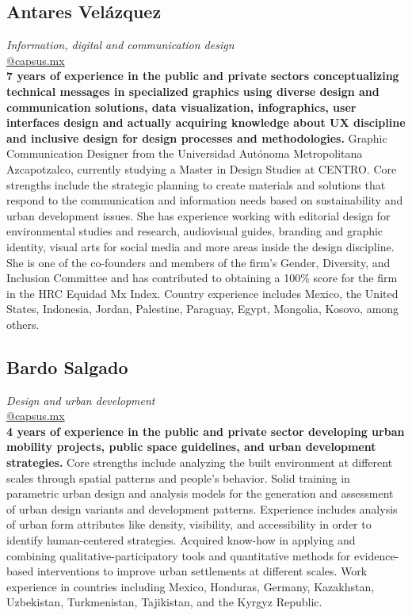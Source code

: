 \documentclass[
	a4paper,
	12pt,
	unnumberedsections,
]{CSSullivanBusinessReport}
\begin{document}
\subsection*{Antares Velázquez}
\textit{Information, digital and communication design} \\
\href{mailto:@capsus.mx}{@capsus.mx} \\[0.5em]
\textbf{7 years of experience in the public and private sectors conceptualizing technical messages in specialized graphics using diverse design and communication solutions, data visualization, infographics, user interfaces design and actually acquiring knowledge about UX discipline and inclusive design for design processes and methodologies.} Graphic Communication Designer from the Universidad Autónoma Metropolitana Azcapotzalco, currently studying a Master in Design Studies at CENTRO. Core strengths include the strategic planning to create materials and solutions that respond to the communication and information needs based on sustainability and urban development issues. She has experience working with editorial design for environmental studies and research, audiovisual guides, branding and graphic identity, visual arts for social media and more areas inside the design discipline. She is one of the co-founders and members of the firm’s Gender, Diversity, and Inclusion Committee and has contributed to obtaining a 100\% score for the firm in the HRC Equidad Mx Index. Country experience includes Mexico, the United States, Indonesia, Jordan, Palestine, Paraguay, Egypt, Mongolia, Kosovo, among others.

\subsection*{Bardo Salgado}
\textit{Design and urban development} \\
\href{mailto:@capsus.mx}{@capsus.mx} \\[0.5em]
\textbf{4 years of experience in the public and private sector developing urban mobility projects, public space guidelines, and urban development strategies.} Core strengths include analyzing the built environment at different scales through spatial patterns and people's behavior. Solid training in parametric urban design and analysis models for the generation and assessment of urban design variants and development patterns. Experience includes analysis of urban form attributes like density, visibility, and accessibility in order to identify human-centered strategies. Acquired know-how in applying and combining qualitative-participatory tools and quantitative methods for evidence-based interventions to improve urban settlements at different scales. Work experience in countries including Mexico, Honduras, Germany, Kazakhstan, Uzbekistan, Turkmenistan, Tajikistan, and the Kyrgyz Republic.
\end{document}
